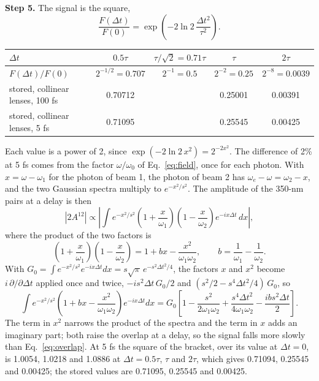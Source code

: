 \documentclass[11pt]{article}
\begin{document}
\textbf{Step 5.} The signal is the square,
\begin{equation}\frac{F(\Delta t)}{F(0)} = \exp\!\left(-2\ln 2\,\frac{\Delta t^2}{\tau^2}\right) .\label{eq:overlap}\end{equation}
\begin{center}\small\begin{tabular}{lcccc}\toprule
$\Delta t$ & $0.5\tau$ & $\tau/\sqrt2 = 0.71\tau$ & $\tau$ & $2\tau$\\\midrule
$F(\Delta t)/F(0)$ & $2^{-1/2} = 0.707$ & $2^{-1} = 0.5$ & $2^{-2} = 0.25$ & $2^{-8} = 0.0039$\\
stored, collinear lenses, 100 fs & 0.70712 & & 0.25001 & 0.00391\\
stored, collinear lenses, 5 fs & 0.71095 & & 0.25545 & 0.00425\\\bottomrule\end{tabular}\end{center}
Each value is a power of 2, since $\exp(-2\ln 2\,x^2) = 2^{-2x^2}$. The difference of 2\% at 5 fs comes from the
factor $\omega/\omega_0$ of Eq.~\ref{eq:field}, once for each photon. With $x = \omega - \omega_1$ for the photon of
beam 1, the photon of beam 2 has $\omega_e - \omega = \omega_2 - x$, and the two Gaussian spectra multiply to
$e^{-x^2/s^2}$. The amplitude of the 350-nm pairs at a delay is then
\begin{equation}|2A^{12}| \propto \left|\int e^{-x^2/s^2}\left(1 + \frac{x}{\omega_1}\right)\left(1 - \frac{x}{\omega_2}\right)
e^{-ix\Delta t}\,dx\right| ,\end{equation}
where the product of the two factors is
\begin{equation}\left(1 + \frac{x}{\omega_1}\right)\left(1 - \frac{x}{\omega_2}\right) = 1 + bx - \frac{x^2}{\omega_1\omega_2},\qquad
b = \frac{1}{\omega_1} - \frac{1}{\omega_2} .\end{equation}
With $G_0 = \int e^{-x^2/s^2}e^{-ix\Delta t}dx = s\sqrt\pi\,e^{-s^2\Delta t^2/4}$, the factors $x$ and $x^2$ become
$i\,\partial/\partial\Delta t$ applied once and twice, $-is^2\Delta t\,G_0/2$ and $(s^2/2 - s^4\Delta t^2/4)\,G_0$, so
\begin{equation}\int e^{-x^2/s^2}\left(1 + bx - \frac{x^2}{\omega_1\omega_2}\right)e^{-ix\Delta t}dx
= G_0\left[1 - \frac{s^2}{2\omega_1\omega_2} + \frac{s^4\Delta t^2}{4\omega_1\omega_2} - \frac{ibs^2\Delta t}{2}\right] .\end{equation}
The term in $x^2$ narrows the product of the spectra and the term in $x$ adds an imaginary part; both raise the
overlap at a delay, so the signal falls more slowly than Eq.~\ref{eq:overlap}. At 5 fs the square of the bracket,
over its value at $\Delta t = 0$, is 1.0054, 1.0218 and 1.0886 at $\Delta t = 0.5\tau$, $\tau$ and $2\tau$, which gives
0.71094, 0.25545 and 0.00425; the stored values are 0.71095, 0.25545 and 0.00425.
\end{document}

